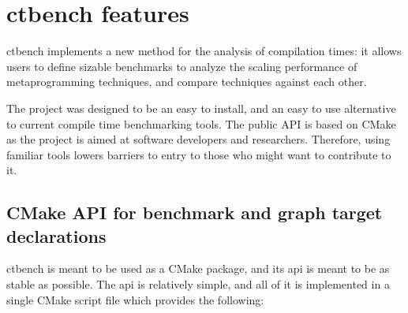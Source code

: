 \documentclass[../main]{subfiles}
\begin{document}
\section{
  ctbench features
}

ctbench implements a new method for the analysis of compilation times:
it allows users to define \cpp sizable benchmarks to analyze the scaling
performance of \cpp metaprogramming techniques, and compare techniques
against each other.

The project was designed to be an easy to install,
and an easy to use alternative to current compile time benchmarking tools.
The public API is based on CMake as the project is aimed at \cpp software
developers and researchers. Therefore, using familiar tools
lowers barriers to entry to those who might want to contribute to it.

\subsection{
  CMake API for benchmark and graph target declarations
}
\label{lbl:ctbench-cmake-api}

ctbench is meant to be used as a CMake package, and its \gls{api} is meant to be
as stable as possible. The \gls{api} is relatively simple, and all of it is
implemented in a single CMake script file which provides the following:
\end{document}
